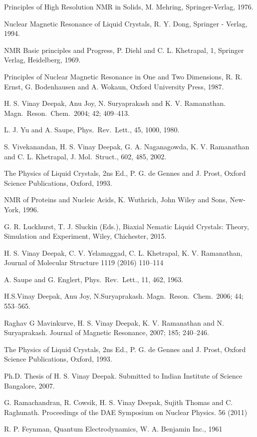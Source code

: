 \begin{thebibliography}{99}
 Principles of High Resolution NMR in Solids, M. Mehring, Springer-Verlag, 1976.

 Nuclear Magnetic Resonance of Liquid Crystals, R. Y. Dong, Springer - Verlag, 1994.

 NMR Basic principles and Progress, P. Diehl and C. L. Khetrapal, 1, Springer Verlag, Heidelberg, 1969.

 Principles of Nuclear Magnetic Resonance in One and Two Dimensions, R. R. Ernst, G. Bodenhausen and A. Wokaun, Oxford University Press, 1987.

 H. S. Vinay Deepak, Anu Joy, N. Suryaprakash and K. V. Ramanathan. Magn.\ Reson.\ Chem.\ 2004; 42; 409--413.

 L. J. Yu and A. Saupe, Phys.\ Rev.\ Lett., 45, 1000, 1980.

 S. Vivekanandan, H. S. Vinay Deepak, G. A. Naganagowda, K. V. Ramanathan and C. L. Khetrapal, J. Mol.\ Struct., 602, 485, 2002.

 The Physics of Liquid Crystals, 2ns Ed., P. G. de Gennes and J. Prost, Oxford Science Publications, Oxford, 1993.

 NMR of Proteins and Nucleic Acids, K. Wuthrich, John Wiley and Sons, New-York, 1996.

 G. R. Luckhurst, T. J. Sluckin (Eds.), Biaxial Nematic Liquid Crystals: Theory, Simulation and Experiment, Wiley, Chichester, 2015.

 H. S. Vinay Deepak, C. V. Yelamaggad, C. L. Khetrapal, K. V. Ramanathan, Journal of Molecular Structure 1119 (2016) 110--114

 A. Saupe and G. Englert, Phys.\ Rev.\ Lett., 11, 462, 1963.

 H.S.Vinay Deepak, Anu Joy, N.Suryaprakash. Magn.\ Reson.\ Chem.\ 2006; 44; 553--565.

 Raghav G Mavinkurve, H. S. Vinay Deepak, K. V. Ramanathan and N. Suryaprakash. Journal of Magnetic Resonance, 2007; 185; 240--246.

 The Physics of Liquid Crystals, 2ns Ed., P. G. de Gennes and J. Prost, Oxford Science Publications, Oxford, 1993.

 Ph.D. Thesis of H. S. Vinay Deepak. Submitted to Indian Institute of Science Bangalore, 2007.

 G. Ramachandran, R. Cowsik, H. S. Vinay Deepak, Sujith Thomas and C. Raghunath. Proceedings of the DAE Symposium on Nuclear Physics. 56 (2011)

 R. P. Feynman, Quantum Electrodynamics, W. A. Benjamin Inc., 1961
\end{thebibliography}
\vskip 1cm

